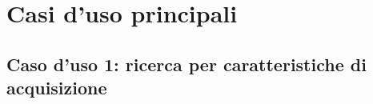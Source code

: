 \section{Casi d'uso principali}
\label{sec:casiduso}
%
%
%

\subsection{Caso d'uso 1: ricerca per caratteristiche di acquisizione}
\label{subsec:cu1}
%
%
%
%
%
%
%
%
%

